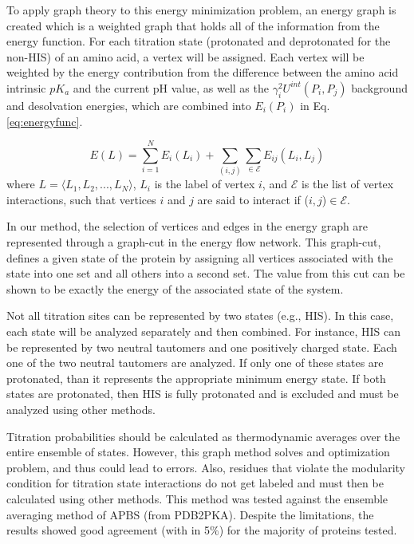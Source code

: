 \documentclass[journal=jpcbfk, manuscript=article]{achemso}
\begin{document}
To apply graph theory to this energy minimization problem, an energy graph is created which is a weighted graph that holds all of the information from the energy function. For each titration state (protonated and deprotonated for the non-HIS) of an amino acid, a vertex will be assigned. Each vertex will be weighted by the energy contribution from the difference between the amino acid intrinsic $pK_a$ and the current pH value, as well as the $\gamma _i^2U^{int}(P_i,P_j)$ background and desolvation energies, which are combined into $E_i(P_i)$ in Eq. \ref{eq:energyfunc}.

\begin{equation}\label{eq:energyfunc}
	E(L)=\sum_{i=1}^NE_i(L_i)+\sum_{(i,j)}\sum_{\in\mathcal{E}}E_{ij}(L_i,L_j)
\end{equation}
where $L=\langle L_1,L_2, ..., L_N\rangle$, $L_i$ is the label of vertex $i$, and $\mathcal{E}$ is the list of vertex interactions, such that vertices $i$ and $j$ are said to interact if ($i,j$)$\in \mathcal{E}$.

In our method, the selection of vertices and edges in the energy graph are represented through a graph-cut in the energy flow network. This graph-cut, defines a given state of the protein by assigning all vertices associated with the state into one set and all others into a second set.  The value from this cut can be shown to be exactly the energy of the associated state of the system.

Not all titration sites can be represented by two states (e.g., HIS). In this case, each state will be analyzed separately and then combined. For instance, HIS can be represented by two neutral tautomers and one positively charged state. Each one of the two neutral tautomers are analyzed. If only one of these states are protonated, than it represents the appropriate minimum energy state. If both states are protonated, then HIS is fully protonated and is excluded and must be analyzed using other methods.

Titration probabilities should be calculated as thermodynamic averages over the entire ensemble of states. However, this graph method solves and optimization problem, and thus could lead to errors.  Also, residues that violate the modularity condition for titration state interactions do not get labeled and  must then be calculated using other methods. This method was tested against the ensemble averaging method of APBS (from PDB2PKA). Despite the limitations, the results showed good agreement (with in 5$\%$) for the majority of proteins tested.
\end{document}
